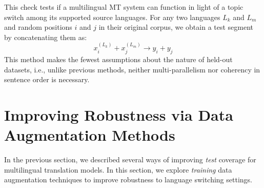 \begin{description}[itemsep=-2mm,topsep=0mm,leftmargin=3mm]
    \item[R-XL:] This check tests if a multilingual MT system can function in light of a topic switch among its supported source languages. 
    For any two languages $L_k$ and $L_m$ and random positions $i$ and $j$ in their original corpus, we obtain a test segment by concatenating them as: 
    $$ x^{(L_k)}_i + x^{(L_m)}_j \rightarrow y_i + y_j $$
     This method makes the fewest assumptions about the nature of held-out datasets, i.e., unlike previous methods, neither multi-parallelism nor coherency in sentence order is necessary.
 \end{description}
 

\section{Improving Robustness via Data Augmentation Methods}
\label{sec:train-aug}
In the previous section, we described several ways of improving \textit{test} coverage for multilingual translation models.
In this section, we explore \textit{training} data augmentation techniques to improve robustness to language switching settings.

